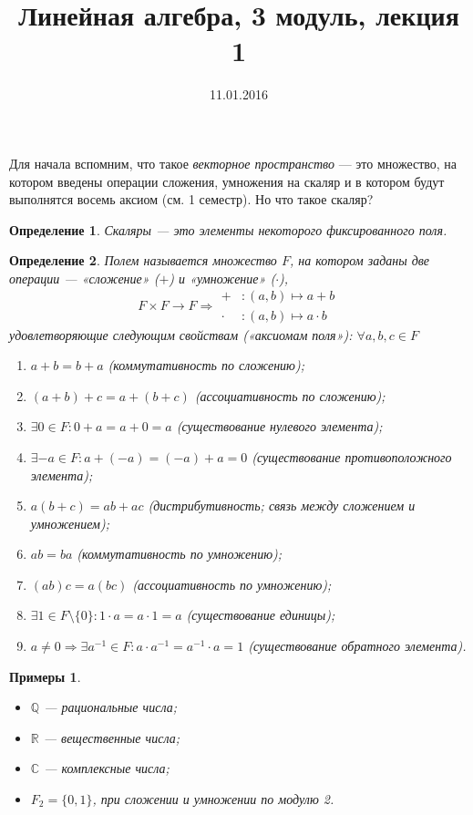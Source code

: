 \documentclass[a4paper,12pt]{article}
\author{}
\title{Линейная алгебра, 3 модуль, лекция 1}
\date{11.01.2016}
\newtheorem*{Def}{Определение}
\newtheorem*{Examples}{Примеры}
\begin{document}
\maketitle

Для начала вспомним, что такое \textit{векторное пространство} — это множество, на котором введены операции сложения, умножения на скаляр и в котором будут выполнятся восемь аксиом (см. 1 семестр). Но что такое скаляр?

\begin{Def}
Скаляры — это элементы некоторого фиксированного поля. 
\end{Def}

\begin{Def}
Полем называется множество $F$, на котором заданы две операции —  «сложение» ($+$) и «умножение» ($\cdot$),
\[
F \times F \rightarrow F \Rightarrow
\begin{aligned}
+&: (a, b) \mapsto a + b \\
\cdot&: (a, b) \mapsto a \cdot b
\end{aligned}
\]
удовлетворяющие следующим свойствам («аксиомам поля»): $\forall a, b, c \in F$
\begin{enumerate}
\item $a + b = b + a$ (коммутативность по сложению);
\item $(a + b) + c = a + (b + c)$ (ассоциативность по сложению);
\item $\exists 0 \in F : 0 + a = a + 0 = a$ (существование нулевого элемента);
\item $\exists -a \in F : a + (-a) = (-a) + a = 0$ (существование противоположного элемента);
\item $a(b + c) = ab + ac$ (дистрибутивность; связь между сложением и умножением);
\item $ab = ba$ (коммутативность по умножению);
\item $(ab)c = a(bc)$ (ассоциативность по умножению);
\item $\exists 1 \in F\setminus\{0\} : 1 \cdot a = a \cdot 1 = a$ (существование единицы);
\item $a \neq 0 \Rightarrow \exists a^{-1} \in F : a \cdot a^{-1} = a ^{-1} \cdot a = 1$ (существование обратного элемента).
\end{enumerate}
\end{Def}

\begin{Examples} \ 
\begin{itemize}
\item $\mathbb{Q}$ — рациональные числа; 
\item $\mathbb{R}$ — вещественные числа;
\item $\mathbb{C}$ — комплексные числа;
\item $F_2 = \{0, 1\}$, при сложении и умножении по модулю 2.
\end{itemize}
\end{Examples}
\end{document}
